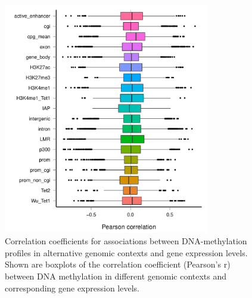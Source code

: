 \begin{figure}[htbp!]
\centering
\includegraphics[width=0.8\textwidth]{gene_r}
\caption[Correlation coefficients for associations between DNA-methylation profiles in alternative genomic contexts and gene expression levels.]{Correlation coefficients for associations between DNA-methylation profiles in alternative genomic contexts and gene expression levels. Shown are boxplots of the correlation coefficient (Pearson's r) between DNA methylation in different genomic contexts and corresponding gene expression levels.}
\label{fig:mt_gene_r}
\end{figure}

